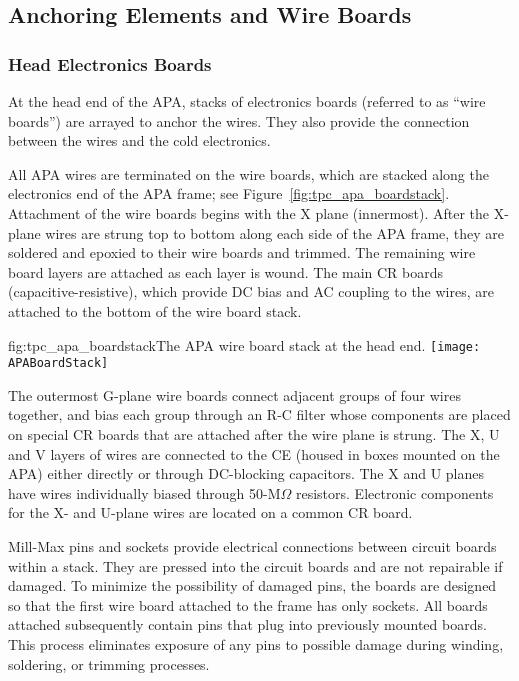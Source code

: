 \subsection{Anchoring Elements and Wire Boards}
\label{sec:fdsp-apa-boards}


\subsubsection{Head Electronics Boards}

At the head end of the APA, stacks of electronics boards (referred to as ``wire boards'') are arrayed to anchor the wires.  They also provide the connection between the wires and the cold electronics.

All APA wires are terminated on the wire boards, which are stacked along the electronics end of the APA frame; see Figure~\ref{fig:tpc_apa_boardstack}. 
Attachment of the wire boards begins with the X plane (innermost). After the X-plane wires are strung top to bottom along each side of the APA frame, they are soldered and epoxied to their wire boards and trimmed. The remaining wire board layers are attached as each layer is wound.  The main CR boards (capacitive-resistive), which provide DC bias and AC coupling to the wires, are attached to the bottom of the wire board stack. 

\begin{dunefigure}{fig:tpc_apa_boardstack}{The APA wire board stack at the head end.}
\texttt{[image: APABoardStack]}
\end{dunefigure}

The outermost G-plane wire boards connect adjacent groups of four wires together, and bias each group through an R-C filter whose components are placed on special CR boards   
that are attached after the wire plane is strung. The X, U and V layers of wires are connected to the CE (housed in boxes mounted on the APA) either directly or through DC-blocking capacitors. The X and U planes have wires individually biased through 50-M$\Omega$ resistors. Electronic components for the X- and U-plane wires are located on a common CR board. 

Mill-Max pins and sockets provide electrical connections between circuit boards within a stack. They are pressed into the circuit boards and are not repairable if damaged. To minimize the possibility of damaged pins, the boards are designed so that the first wire board attached to the frame has only sockets. All boards attached subsequently contain pins that plug into previously mounted boards. This process eliminates exposure of any pins to possible damage during winding, soldering, or trimming processes.

